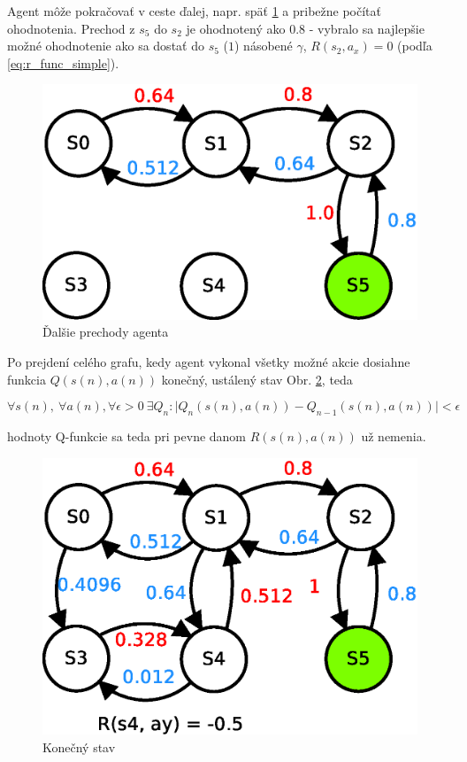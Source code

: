 Agent môže pokračovať v ceste ďalej, napr. späť \ref{img:q_learning_5} a pribežne
počítať ohodnotenia. Prechod z $s_5$ do $s_2$ je ohodnotený ako $0.8$ - vybralo sa najlepšie
možné ohodnotenie ako sa dostať do $s_5$ ($1$) násobené $\gamma$, $R(s_2, a_x) = 0$
(podľa \ref{eq:r_func_simple}).


\begin{figure}[!htb]
\center
\includegraphics[scale=.6]{../diagrams/q_learning_table_05.eps}
\caption{Ďalšie prechody agenta}
\label{img:q_learning_5}
\end{figure}

Po prejdení celého grafu, kedy agent vykonal všetky možné akcie dosiahne
funkcia $Q(s(n), a(n))$ konečný, ustálený stav Obr. \ref{img:q_learning_6}, teda

\begin{equation}
\forall s(n),\ \forall a(n),\forall \epsilon > 0 \  \exists Q_{n} : \mid Q_{n}(s(n), a(n)) - Q_{n-1}(s(n), a(n)) \mid < \epsilon
\label{eq:q_learning_finish}
\end{equation}

hodnoty Q-funkcie sa teda pri pevne danom $R(s(n), a(n))$ už nemenia.


\begin{figure}[!htb]
\center
\includegraphics[scale=.6]{../diagrams/q_learning_table_06.eps}
\caption{Konečný stav}
\label{img:q_learning_6}
\end{figure}



